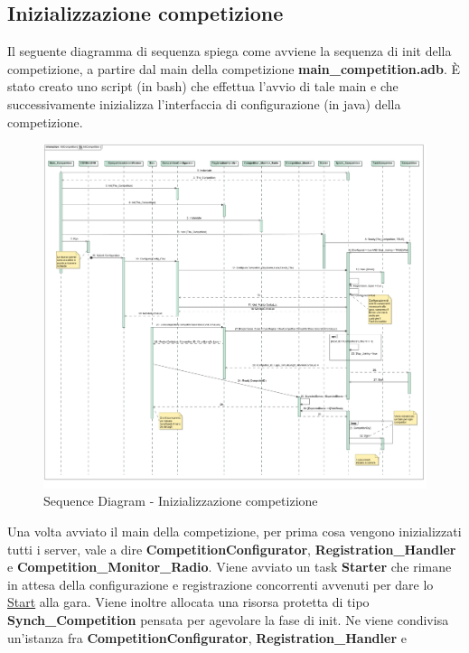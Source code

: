 \subsection{Inizializzazione competizione}
Il seguente diagramma di sequenza spiega come avviene la sequenza di init della
competizione, a partire dal main della competizione
\textbf{main\_competition.adb}.
\`{E} stato creato uno script (in bash) che effettua l'avvio di tale
main e che successivamente inizializza 
l'interfaccia di configurazione (in java) della competizione.
\begin{center}
\begin{figure}[h!]
\advance\leftskip-3.2cm
	\includegraphics[angle=90,scale=0.35]{img/SequenceDiagrams/InitCompetition.jpg}
\caption{Sequence Diagram - Inizializzazione competizione}
\end{figure}
\end{center}
\clearpage
Una volta avviato il main della competizione, per prima cosa vengono
inizializzati tutti i server, vale a dire \textbf{CompetitionConfigurator},
\textbf{Registration\_Handler} e \textbf{Competition\_Monitor\_Radio}. Viene
avviato
un task \textbf{Starter} che rimane in attesa
della configurazione e registrazione concorrenti avvenuti per dare lo
\underline{Start} alla gara. Viene inoltre allocata una risorsa protetta di tipo
\textbf{Synch\_Competition} pensata
per agevolare la fase di init. Ne viene condivisa un'istanza fra
\textbf{CompetitionConfigurator}, \textbf{Registration\_Handler} e
